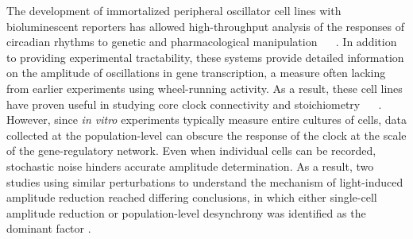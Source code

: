 \documentclass[11pt, letterpaper]{article}
\providecommand{\DIFadd}[1]{{\protect\color{blue}#1}} %
\providecommand{\DIFdel}[1]{{\protect\color{red}}}                      %
\providecommand{\DIFaddbegin}{} %
\providecommand{\DIFaddend}{} %
\providecommand{\DIFdelbegin}{} %
\providecommand{\DIFdelend}{} %
\begin{document}
The development of immortalized peripheral oscillator cell lines with bioluminescent reporters has allowed \DIFdelbegin \DIFdel{widespread and }\DIFdelend high-throughput analysis of \DIFdelbegin \DIFdel{circadian rhythms responses }\DIFdelend \DIFaddbegin \DIFadd{the responses of circadian rhythms }\DIFaddend to genetic and pharmacological manipulation \DIFdelbegin \DIFdel{\mbox{%
\cite{Balsalobre1998, Hirota2010, Ramanathan2014}
}%
}\DIFdelend \DIFaddbegin \DIFadd{\mbox{%
\cite{Hirota2010, Ramanathan2014}
}%
}\DIFaddend .
In addition to providing experimental tractability, these systems provide detailed information on the amplitude of oscillations in gene transcription, a measure often lacking from earlier experiments using wheel-running activity\DIFdelbegin \DIFdel{data}\DIFdelend .
 As a result, these cell lines have proven useful in studying core clock connectivity and stoichiometry \DIFdelbegin \DIFdel{\mbox{%
\cite{Zhang2009, Hirota2012}
}%
, and will likely aid in the
development of therapies to boost clock amplitudes}\DIFdelend \DIFaddbegin \DIFadd{\mbox{%
\cite{Baggs2009}
}%
}\DIFaddend .
However, since {\itshape in vitro} experiments typically measure entire cultures of cells, data collected at \DIFaddbegin \DIFadd{the }\DIFaddend population-level can obscure the response of the clock at the scale of the gene-regulatory network.
Even when individual cells can be recorded, stochastic noise hinders accurate amplitude determination.
\DIFdelbegin \DIFdel{Two }\DIFdelend \DIFaddbegin \DIFadd{As a result, two }\DIFaddend studies using similar perturbations to understand the mechanism of light-induced amplitude reduction reached differing conclusions, in which either single-cell amplitude reduction or population-level desynchrony was identified as the dominant factor \cite{Pulivarthy2007, Ukai2007}.
\end{document}
